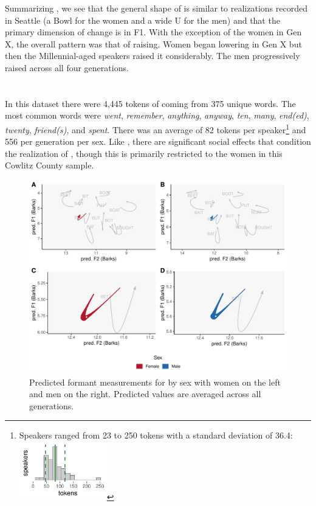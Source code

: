 Summarizing \ban, we see that the general shape of \ban is similar to realizations recorded in Seattle (a Bowl for the women and a wide U for the men) and that the primary dimension of change is in F1. With the exception of the women in Gen X, the overall pattern was that of raising. Women began lowering \ban in Gen X but then the Millennial-aged speakers raised it considerably. The men progressively raised \ban across all four generations.






\section{\ben}
\label{BEN}

In this dataset there were 4,445 tokens of \ben coming from 375 unique words. The most common words were \textit{went}, \textit{remember}, \textit{anything}, \textit{anyway}, \textit{ten}, \textit{many}, \textit{end(ed)}, \textit{twenty}, \textit{friend(s)}, and \textit{spent}. There was an average of 82 tokens per speaker\footnote{Speakers ranged from 23 to 250 tokens with a standard deviation of 36.4: \includegraphics[width = 1.5in]{Figures/BEN/BEN_tiny.pdf}} and 556 per generation per sex. Like \ban, there are significant social effects that condition the realization of \ben, though this is primarily restricted to the women in this Cowlitz County sample.

\begin{figure}[tb!]
    \centering
    \includegraphics[width = 6.5in]{Figures/BEN/BEN_four_panel_plot_summarized.pdf}
    \caption[Predicted formant measurements for \ben by sex.]{Predicted formant measurements for \ben by sex with women on the left and men on the right. Predicted values are averaged across all generations.}
    \label{fig:BEN_four_panel_plot_summarized}
\end{figure}


